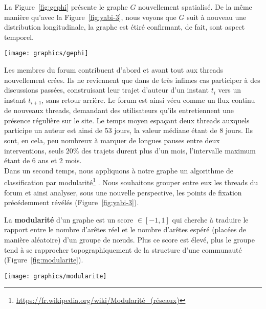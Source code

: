 \documentclass[symmetric,justified,marginals=raggedouter]{tufte-book}
\begin{document}
La Figure~\ref{fig:gephi} présente le graphe $G$ nouvellement spatialisé. De la même manière qu'avec la Figure~\ref{fig:yabi-3}, nous voyons que $G$ suit à nouveau une distribution longitudinale, la graphe est étiré confirmant, de fait, sont aspect temporel. 

\begin{figure*}
  \texttt{[image: graphics/gephi]}
  \caption{Spatialisation du graphe $G$ par \textit{force atlas} et clustering des threads par classes de modularité}
  \label{fig:gephi}
\end{figure*} 

\noindent Les membres du forum contribuent d'abord et avant tout aux threads nouvellement crées. Ils ne reviennent que dans de très infimes cas participer à des discussions passées, construisant leur trajet d'auteur d'un instant $t_i$ vers un instant $t_{i+1}$, sans retour arrière. Le forum est ainsi vécu comme un flux continu de nouveaux threads, demandant des utilisateurs qu'ils entretiennent une présence régulière sur le site. Le temps moyen espaçant deux threads auxquels participe un auteur est ainsi de 53 jours, la valeur médiane étant de 8 jours. Ils sont, en cela, peu nombreux à marquer de longues pauses entre deux interventions, seuls $20\%$ des trajets durent plus d'un mois, l'intervalle maximum étant de 6 ans et 2 mois. \\  

\noindent Dans un second temps, nous appliquons à notre graphe un algorithme de classification par modularité\footnote{\RaggedOuter \url{https://fr.wikipedia.org/wiki/Modularité\_(réseaux)}} \citep{blondel_fast_2008}. Nous souhaitons grouper entre eux les threads du forum et ainsi analyser, sous une nouvelle perspective, les points de fixation précédemment révélés (Figure~\ref{fig:yabi-3}). 

La \textbf{modularité} d'un graphe est un score $\in [-1,1]$ qui cherche à traduire le rapport entre le nombre d'arêtes réel et le nombre d'arêtes espéré (placées de manière aléatoire) d'un groupe de nœuds. Plus ce score est élevé, plus le groupe tend à se rapprocher topographiquement de la structure d'une communauté (Figure~\ref{fig:modularite}).

\begin{marginfigure}%
  \texttt{[image: graphics/modularite]}
  \vspace*{0.2cm}  
  \caption{Exemple de clustering d'un graphe en 4 classes de modularité (couleurs)}
  \label{fig:modularite}
\end{marginfigure}  
\end{document}
